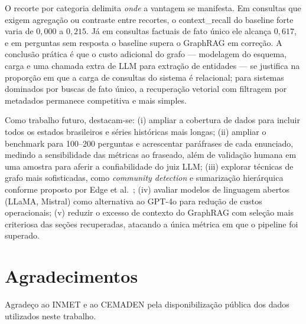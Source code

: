 \documentclass[conference]{IEEEtran}
\begin{document}
O recorte por categoria delimita \emph{onde} a vantagem se manifesta. Em
consultas que exigem agregação ou contraste entre recortes, o context\_recall do
baseline forte varia de $0{,}000$ a $0{,}215$. Já em consultas factuais de fato
único ele alcança $0{,}617$, e em perguntas sem resposta o baseline supera o
GraphRAG em correção. A conclusão prática é que o custo adicional do grafo ---
modelagem do esquema, carga e uma chamada extra de LLM para extração de
entidades --- se justifica na proporção em que a carga de consultas do sistema é
relacional; para sistemas dominados por buscas de fato único, a recuperação
vetorial com filtragem por metadados permanece competitiva e mais simples.

Como trabalho futuro, destacam-se:
(i) ampliar a cobertura de dados para incluir todos os estados
brasileiros e séries históricas mais longas;
(ii) ampliar o benchmark para 100--200 perguntas e acrescentar
paráfrases de cada enunciado, medindo a sensibilidade das métricas ao
fraseado, além de validação humana em uma amostra para aferir a
confiabilidade do juiz LLM;
(iii) explorar técnicas de grafo mais sofisticadas, como
\textit{community detection} e sumarização hierárquica
conforme proposto por Edge et al.~\cite{edge2024graphrag};
(iv) avaliar modelos de linguagem abertos (LLaMA, Mistral)
como alternativa ao GPT-4o para redução de custos operacionais;
(v) reduzir o excesso de contexto do GraphRAG com seleção mais criteriosa das
seções recuperadas, atacando a única métrica em que o pipeline foi superado.

\section*{Agradecimentos}

Agradeço ao INMET e ao CEMADEN pela disponibilização
pública dos dados utilizados neste trabalho.
\end{document}
